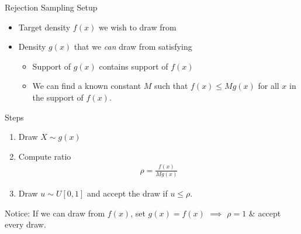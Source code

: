 \documentclass[aspectratio=169, handout]{beamer}
\begin{document}
{\footnotesize
\begin{frame}{Rejection Sampling}
Setup
\begin{itemize}
  \item Target density $f(x)$ we wish to draw from
  \item Density $g(x)$ that we \emph{can} draw from satisfying
    \begin{itemize}
      \item Support of $g(x)$ contains support of $f(x)$
      \item We can find a known constant $M$ such that
        $f(x)\leq Mg(x)$ for all $x$ in the support of $f(x)$.
    \end{itemize}
\end{itemize}
\vspace{-8pt}
Steps
\vspace{-8pt}
\begin{enumerate}
  \item Draw $X\sim g(x)$
  \item Compute ratio
    \begin{align*}
      \rho = \frac{f(x)}{Mg(x)}
    \end{align*}
  \item Draw $u\sim U[0,1]$ and accept the draw if $u\leq \rho$.
\end{enumerate}
Notice: If we can draw from $f(x)$, set $g(x)=f(x)$ $\implies$ $\rho=1$
\& accept every draw.
\end{frame}
}

\end{document}
